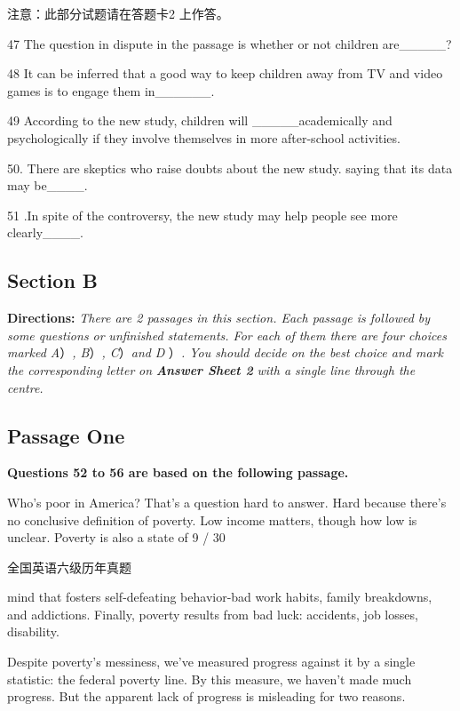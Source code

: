 \documentclass[UTF8,11pt]{ctexart}
\begin{document}
注意：此部分试题请在答题卡2 上作答。


47 The question in dispute in the passage is whether or not children are\_\_\_\_\_?


48 It can be inferred that a good way to keep children away from TV and video games is to engage them in\_\_\_\_\_\_.


49 According to the new study, children will \_\_\_\_\_academically and psychologically if they involve themselves in more after-school activities.


50. There are skeptics who raise doubts about the new study. saying that its data may be\_\_\_\_.


51 .In spite of the controversy, the new study may help people see more clearly\_\_\_\_.


\subsection*{\textbf{Section B}}


\textbf{Directions:}\textit{ There are 2 passages in this section. Each passage is followed by some questions or} \textit{unfinished statements. For each of them there are four choices marked A}）\textit{, B}）\textit{, C}）\textit{and} \textit{D} ）\textit{. You should decide on the best choice and mark the corresponding letter} \textit{on}\textbf{\textit{ Answer Sheet 2}}\textit{ with a single line through the centre.}


\subsection*{\textbf{Passage One}}


\textbf{Questions 52 to 56 are based on the following passage.}


Who's poor in America? That's a question hard to answer. Hard because there's no conclusive definition of poverty. Low income matters, though how low is unclear. Poverty is also a state of 9 / 30


全国英语六级历年真题


mind that fosters self-defeating behavior-bad work habits, family breakdowns, and addictions. Finally, poverty results from bad luck: accidents, job losses, disability.


Despite poverty's messiness, we've measured progress against it by a single statistic: the federal poverty line. By this measure, we haven't made much progress. But the apparent lack of progress is misleading for two reasons.
\end{document}
